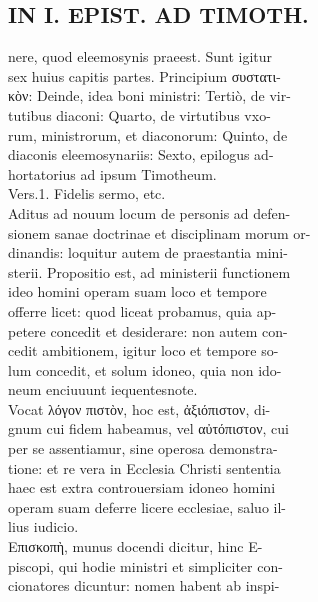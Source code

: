 \documentclass{article}
\begin{document}
\begin{pages}
\section*{IN I. EPIST. AD TIMOTH. \\
                }
nere, quod eleemosynis praeest. Sunt igitur \\
                sex huius capitis partes. Principium συστατι- \\
                κὸν: Deinde, idea boni ministri: Tertiò, de vir- \\
                tutibus diaconi: Quarto, de virtutibus vxo- \\
                rum, ministrorum, et diaconorum: Quinto, de \\
                diaconis eleemosynariis: Sexto, epilogus ad- \\
                hortatorius ad ipsum Timotheum. \\
                Vers.1. Fidelis sermo, etc. \\
                Aditus ad nouum locum de personis ad defen- \\
                sionem sanae doctrinae et disciplinam morum or- \\
                dinandis: loquitur autem de praestantia mini- \\
                sterii. Propositio est, ad ministerii functionem \\
                ideo homini operam suam loco et tempore \\
                offerre licet: quod liceat probamus, quia ap- \\
                petere concedit et desiderare: non autem con- \\
                cedit ambitionem, igitur loco et tempore so- \\
                lum concedit, et solum idoneo, quia non ido- \\
                neum enciuuunt iequentesnote. \\
                Vocat λόγον πιστὸν, hoc est, ἀξιόπιστον, di- \\
                gnum cui fidem habeamus, vel αὐτόπιστον, cui \\
                per se assentiamur, sine operosa demonstra- \\
                tione: et re vera in Ecclesia Christi sententia \\
                haec est extra controuersiam idoneo homini \\
                operam suam deferre licere ecclesiae, saluo il- \\
                lius iudicio. \\
                Επισκοπὴ, munus docendi dicitur, hinc E- \\
                piscopi, qui hodie ministri et simpliciter con- \\
                cionatores dicuntur: nomen habent ab inspi- \\
                

\end{pages}
\end{document}
